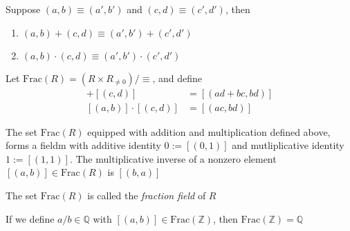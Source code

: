 \begin{proposition}
Suppose $(a,b)\equiv(a',b')$ and $(c,d)\equiv(c',d')$, then
\begin{enumerate}
\item
$(a,b)+(c,d)\equiv(a',b')+(c',d')$
\item
$(a,b)\cdot(c,d)\equiv(a',b')\cdot(c',d')$
\end{enumerate}
\end{proposition}

Let $\mbox{Frac}(R)=(R\times R_{\ne0})/\equiv$, and define
\begin{align*}
[(a,b)]+[(c,d)]&=[(ad+bc,bd)]\\
[(a,b)]\cdot[(c,d)]&=[(ac,bd)]
\end{align*}

\begin{proposition}
The set $\mbox{Frac}(R)$ equipped with addition and multiplication defined above, forms a fieldm with additive identity $0:=[(0,1)]$ and mutliplicative identity $1:=[(1,1)].$ The multiplicative inverse of a nonzero element $[(a,b)]\in \mbox{Frac}(R)$ is $[(b,a)]$
\end{proposition}

\begin{definition}
The set $\mbox{Frac}(R)$ is called the \emph{fraction field} of $R$
\end{definition}
\begin{remark}
If we define $a/b\in\mathbb{Q}$ with $[(a,b)]\in\mbox{Frac}(\mathbb{Z})$, then $\mbox{Frac}(\mathbb{Z})=\mathbb{Q}$
\end{remark}

